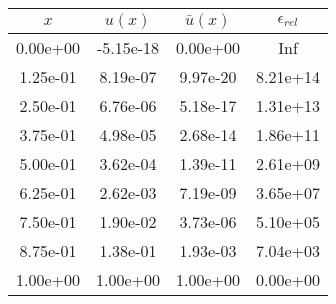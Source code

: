 \begin{tabular}{|c|c|c|c|}
\hline
\textbf{$x$}&\textbf{$u(x)$}&\textbf{$\bar{u}(x)$}&\textbf{$\epsilon_{rel}$}\\\hline
0.00e+00&-5.15e-18&0.00e+00&Inf\\\hline
1.25e-01&8.19e-07&9.97e-20&8.21e+14\\\hline
2.50e-01&6.76e-06&5.18e-17&1.31e+13\\\hline
3.75e-01&4.98e-05&2.68e-14&1.86e+11\\\hline
5.00e-01&3.62e-04&1.39e-11&2.61e+09\\\hline
6.25e-01&2.62e-03&7.19e-09&3.65e+07\\\hline
7.50e-01&1.90e-02&3.73e-06&5.10e+05\\\hline
8.75e-01&1.38e-01&1.93e-03&7.04e+03\\\hline
1.00e+00&1.00e+00&1.00e+00&0.00e+00\\\hline
\end{tabular}

